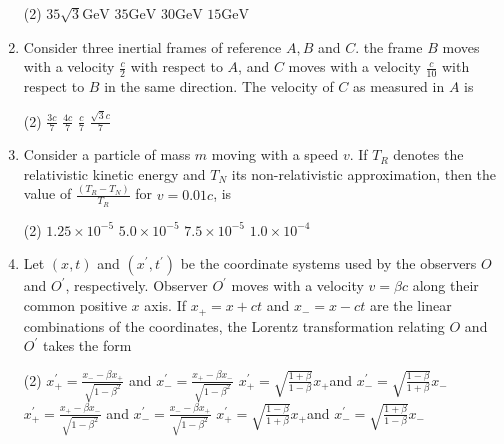 \begin{enumerate}
\begin{tasks}(2)
	\task[\textbf{A.}] $35 \sqrt{3} \mathrm{GeV}$
	\task[\textbf{B.}]$35 \mathrm{GeV}$
	\task[\textbf{C.}]$30 \mathrm{GeV}$
	\task[\textbf{D.}]$15 \mathrm{GeV}$
\end{tasks}
	\item Consider three inertial frames of reference $A, B$ and $C$. the frame $B$ moves with a velocity $\frac{c}{2}$ with respect to $A$, and $C$ moves with a velocity $\frac{c}{10}$ with respect to $B$ in the same direction. The velocity of $C$ as measured in $A$ is
	{}

\begin{tasks}(2)
	\task[\textbf{A.}] $\frac{3 c}{7}$
	\task[\textbf{B.}]$\frac{4 c}{7}$
	\task[\textbf{C.}]$\frac{c}{7}$
	\task[\textbf{D.}] $\frac{\sqrt{3} c}{7}$
\end{tasks}
	\item Consider a particle of mass $m$ moving with a speed $v$. If $T_{R}$ denotes the relativistic kinetic energy and $T_{N}$ its non-relativistic approximation, then the value of $\frac{\left(T_{R}-T_{N}\right)}{T_{R}}$ for $v=0.01 c$, is
	{}
\begin{tasks}(2)
	\task[\textbf{A.}] $1.25 \times 10^{-5}$
	\task[\textbf{B.}]$5.0 \times 10^{-5}$
	\task[\textbf{C.}]$7.5 \times 10^{-5}$
	\task[\textbf{D.}]$1.0 \times 10^{-4}$
\end{tasks}
	\item Let $(x, t)$ and $\left(x^{\prime}, t^{\prime}\right)$ be the coordinate systems used by the observers $O$ and $O^{\prime}$, respectively. Observer $O^{\prime}$ moves with a velocity $v=\beta c$ along their common positive $x$ axis. If $x_{+}=x+c t$ and $x_{-}=x-c t$ are the linear combinations of the coordinates, the Lorentz transformation relating $O$ and $O^{\prime}$ takes the form
	{}
\begin{tasks}(2)
	\task[\textbf{A.}] $x_{+}^{\prime}=\frac{x_{-}-\beta x_{+}}{\sqrt{1-\beta^{2}}}$ and $x_{-}^{\prime}=\frac{x_{+}-\beta x_{-}}{\sqrt{1-\beta^{2}}}$
	\task[\textbf{B.}]$x_{+}^{\prime}=\sqrt{\frac{1+\beta}{1-\beta}} x_{+}$and $x_{-}^{\prime}=\sqrt{\frac{1-\beta}{1+\beta}} x_{-}$
	\task[\textbf{C.}]$x_{+}^{\prime}=\frac{x_{+}-\beta x_{-}}{\sqrt{1-\beta^{2}}}$ and $x_{-}^{\prime}=\frac{x_{-}-\beta x_{+}}{\sqrt{1-\beta^{2}}}$
	\task[\textbf{D.}]$x_{+}^{\prime}=\sqrt{\frac{1-\beta}{1+\beta}} x_{+}$and $x_{-}^{\prime}=\sqrt{\frac{1+\beta}{1-\beta}} x_{-}$
\end{tasks}

\end{enumerate}
